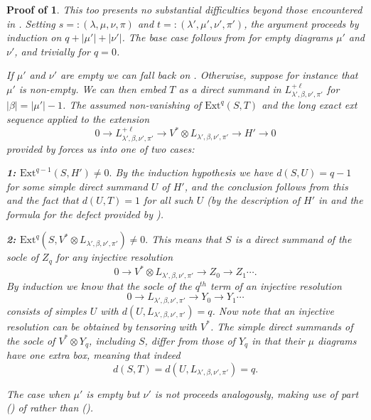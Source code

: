 \documentclass[11pt]{article}
\theoremstyle{plain}
\theoremstyle{nonumberplain}
\theoremstyle{plain}
\numberwithin{equation}{section}
\theoremstyle{nonumberplain}
\newcommand\pf[1]{\newtheorem{#1}{Proof of \Cref{#1}}}
\newcommand\1{{\bf 1}}
\begin{document}
\pf{thm:right-def}
\begin{thm:right-def}
This too presents no substantial difficulties beyond those encountered in \cite[Theorem 3.11]{us0}. Setting $s=:(\lambda,\mu,\nu,\pi)$ and $t=:(\lambda',\mu',\nu',\pi')$, the argument proceeds by induction on $q+|\mu'|+|\nu'|$. The base case follows from  for empty diagrams $\mu'$ and $\nu'$, and trivially for $q=0$. 

If $\mu'$ and $\nu'$ are empty we can fall back on . Otherwise, suppose for instance that $\mu'$ is non-empty. We can then embed $T$ as a direct summand in $L^{+\ell}_{\lambda',\beta,\nu',\pi'}$ 
for $|\beta|=|\mu'|-1$. The assumed non-vanishing of $\mathrm{Ext}^q(S,T)$ and the long exact ext sequence applied to the extension
\begin{equation*}
  0\to L^{+\ell}_{\lambda',\beta,\nu',\pi'}\to V^*\otimes L_{\lambda',\beta,\nu',\pi'} \to H' \to 0
\end{equation*}
provided by  forces us into one of two cases:

\vspace{.5cm}

{\bf 1: $\mathrm{Ext}^{q-1}(S,H')\ne 0.$} By the induction hypothesis we have $d(S,U)=q-1$ for some simple direct summand $U$ of $H'$, and the conclusion follows from this and the fact that $d(U,T)=1$ for all such $U$ (by the description of $H'$ in  and the formula for the defect provided by ). 

\vspace{.5cm}

{\bf 2: $\mathrm{Ext}^{q}(S,V^*\otimes L_{\lambda',\beta,\nu',\pi'})\ne 0.$} This means that $S$ is a direct summand of the socle of $Z_q$ for any injective resolution
\begin{equation}\label{eq:20}
  0\to V^*\otimes L_{\lambda',\beta,\nu',\pi'}\to Z_0\to Z_1\cdots.
\end{equation}
By induction we know that the socle of the $q^{th}$ term of an injective resolution
\begin{equation}\label{eq:21}
  0\to L_{\lambda',\beta,\nu',\pi'}\to Y_0\to Y_1\cdots
\end{equation}
consists of simples $U$ with $d(U,L_{\lambda',\beta,\nu',\pi'})=q$. Now note that an injective resolution  can be obtained by tensoring  with $V^*$. The simple direct summands of the socle of $V^*\otimes Y_q$, including $S$, differ from those of $Y_q$ in that their $\mu$ diagrams have one extra box, meaning that indeed
\begin{equation*}
  d(S,T) = d(U,L_{\lambda',\beta,\nu',\pi'})=q.
\end{equation*}

\vspace{.5cm}

The case when $\mu'$ is empty but $\nu'$ is not proceeds analogously, making use of part \emph{()} of  rather than \emph{()}. 
\end{thm:right-def}
\end{document}
